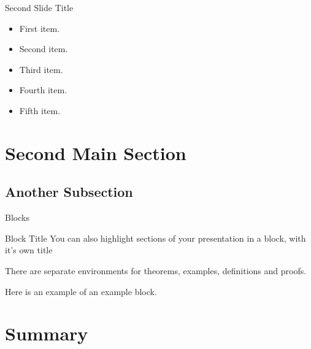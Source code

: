 \documentclass{beamer}
\begin{document}
\begin{frame}{Second Slide Title}
  \begin{itemize}
  \item {
    First item.
    \pause %
  }
  \item {   
    Second item.
  }
  \item<3-> {
    Third item.
  }
  \item<4-> {
    Fourth item.
  }
  \item<5-> {
    Fifth item. 
  }
  \end{itemize}
\end{frame}

\section{Second Main Section}

\subsection{Another Subsection}

\begin{frame}{Blocks}
\begin{block}{Block Title}
You can also highlight sections of your presentation in a block, with it's own title
\end{block}
\begin{theorem}
There are separate environments for theorems, examples, definitions and proofs.
\end{theorem}
\begin{example}
Here is an example of an example block.
\end{example}
\end{frame}

\section*{Summary}
\end{document}
